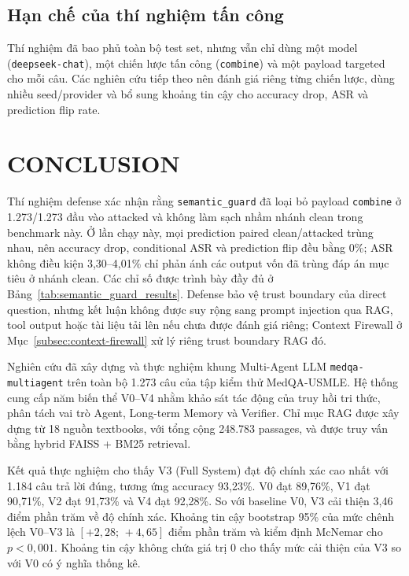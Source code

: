 \subsection{Hạn chế của thí nghiệm tấn công}
Thí nghiệm đã bao phủ toàn bộ test set, nhưng vẫn chỉ dùng một model
(\texttt{deepseek-chat}), một chiến lược tấn công (\texttt{combine}) và một
payload targeted cho mỗi câu. Các nghiên cứu tiếp theo nên đánh giá riêng
từng chiến lược, dùng nhiều seed/provider và bổ sung khoảng tin cậy cho
accuracy drop, ASR và prediction flip rate.

\section{CONCLUSION}

Thí nghiệm defense xác nhận rằng \texttt{semantic\_guard} đã loại bỏ payload
\texttt{combine} ở 1.273/1.273 đầu vào attacked và không làm sạch nhầm nhánh
clean trong benchmark này. Ở lần chạy này, mọi prediction paired clean/attacked
trùng nhau, nên accuracy drop, conditional ASR và prediction flip đều bằng
0\%; ASR không điều kiện 3,30--4,01\% chỉ phản ánh các output vốn đã trùng
đáp án mục tiêu ở nhánh clean. Các chỉ số được trình bày đầy đủ ở
Bảng~\ref{tab:semantic_guard_results}. Defense bảo vệ trust boundary của
direct question, nhưng kết luận không được suy rộng sang prompt injection qua
RAG, tool output hoặc tài liệu tải lên nếu chưa được đánh giá riêng; Context
Firewall ở Mục~\ref{subsec:context-firewall} xử lý riêng trust boundary RAG
đó.

Nghiên cứu đã xây dựng và thực nghiệm khung Multi-Agent LLM
\texttt{medqa-multiagent} trên toàn bộ 1.273 câu của tập kiểm thử
MedQA-USMLE. Hệ thống cung cấp năm biến thể V0--V4 nhằm khảo sát tác
động của truy hồi tri thức, phân tách vai trò Agent, Long-term
Memory và Verifier. Chỉ mục RAG được xây dựng từ 18 nguồn textbooks,
với tổng cộng 248.783 passages, và được truy vấn bằng hybrid FAISS + BM25
retrieval.

Kết quả thực nghiệm cho thấy V3 (Full System) đạt độ chính xác cao
nhất với 1.184 câu trả lời đúng, tương ứng accuracy 93,23\%. V0 đạt
89,76\%, V1 đạt 90,71\%, V2 đạt 91,73\% và V4 đạt 92,28\%. So với
baseline V0, V3 cải thiện 3,46 điểm phần trăm về độ chính xác. Khoảng
tin cậy bootstrap 95\% của mức chênh lệch V0--V3 là
$[+2{,}28;\,+4{,}65]$ điểm phần trăm và kiểm định McNemar cho
$p<0{,}001$. Khoảng tin cậy không chứa giá trị 0 cho thấy mức cải
thiện của V3 so với V0 có ý nghĩa thống kê.

